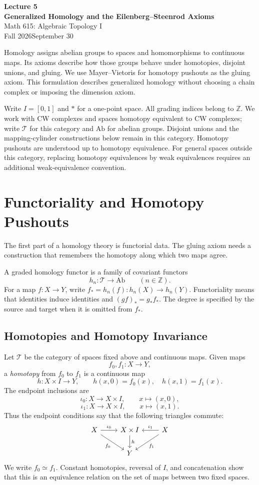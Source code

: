 \documentclass[11pt]{article}
\makeatletter
\newcommand{\afterblock}{\@afterindentfalse\@afterheading}
\newcounter{result}[section]
\renewcommand{\theresult}{\thesection.\arabic{result}}
\newcommand{\resulttitle}[3]{#1 #2\ifstrempty{#3}{}{ (#3)}.}
\newenvironment{entry}[3]{\par\addvspace{7pt}\Needspace{3\baselineskip}\refstepcounter{result}\hypertarget{#2}{}\label{#2}\noindent{\color{burgundy}\textbf{\resulttitle{#1}{\theresult}{#3}}}\quad\ignorespaces}{\par\addvspace{4pt}\afterblock}
\newcommand{\coursetitle}[3]{\begin{center}{\large\bfseries\color{teal}#1}\\[4pt]{\LARGE\bfseries\color{teal}#2}\\[6pt]Math 615: Algebraic Topology I\\Fall 2026\quad\textbar\quad #3\end{center}}
\newcommand{\coursecontents}{{\small\setlength{\parskip}{0pt}\tableofcontents}}
\newcommand{\mapdef}[5]{#1:#2\longrightarrow #3,\qquad #4\longmapsto #5}
\makeatother
\begin{document}
\coursetitle{Lecture 5}{Generalized Homology and the Eilenberg--Steenrod Axioms}{September 30}
Homology assigns abelian groups to spaces and homomorphisms to continuous maps. Its axioms describe how those groups behave under homotopies, disjoint unions, and gluing. We use Mayer--Vietoris for homotopy pushouts as the gluing axiom. This formulation describes generalized homology without choosing a chain complex or imposing the dimension axiom.

Write $I=[0,1]$ and $*$ for a one-point space. All grading indices belong to $\mathbb Z$. We work with CW complexes and spaces homotopy equivalent to CW complexes; write $\mathcal T$ for this category and $\mathrm{Ab}$ for abelian groups. Disjoint unions and the mapping-cylinder constructions below remain in this category. Homotopy pushouts are understood up to homotopy equivalence. For general spaces outside this category, replacing homotopy equivalences by weak equivalences requires an additional weak-equivalence convention.
\coursecontents

\section{Functoriality and Homotopy Pushouts}
The first part of a homology theory is functorial data. The gluing axiom needs a construction that remembers the homotopy along which two maps agree.

\begin{entry}{Definition}{def:graded}{}
A graded homology functor is a family of covariant functors
\[
h_n:\mathcal T\longrightarrow\mathrm{Ab}\qquad(n\in\mathbb Z).
\]
For a map $f:X\longrightarrow Y$, write $f_*=h_n(f):h_n(X)\longrightarrow h_n(Y)$. Functoriality means that identities induce identities and $(gf)_*=g_*f_*$. The degree is specified by the source and target when it is omitted from $f_*$.
\end{entry}

\subsection{Homotopies and Homotopy Invariance}

Let $\mathcal T$ be the category of spaces fixed above and continuous maps. Given maps
\[
f_0,f_1:X\longrightarrow Y,
\]
a \emph{homotopy} from $f_0$ to $f_1$ is a continuous map
\[
h:X\times I\longrightarrow Y,\qquad h(x,0)=f_0(x),\quad h(x,1)=f_1(x).
\]
The endpoint inclusions are
\[
\mapdef{\iota_0}{X}{X\times I}{x}{(x,0)},
\]
\[
\mapdef{\iota_1}{X}{X\times I}{x}{(x,1)}.
\]
Thus the endpoint conditions say that the following triangles commute:
\[
\begin{tikzcd}
X\arrow[r,"\iota_0"]\arrow[dr,"f_0"']&X\times I\arrow[d,"h"]&X\arrow[l,"\iota_1"']\arrow[dl,"f_1"]\\
&Y&
\end{tikzcd}
\]
We write $f_0\simeq f_1$. Constant homotopies, reversal of $I$, and concatenation show that this is an equivalence relation on the set of maps between two fixed spaces.
\end{document}
